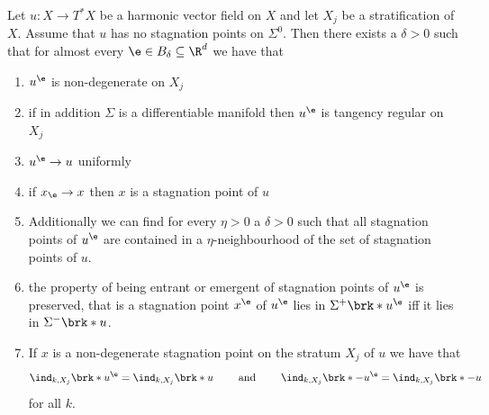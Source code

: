 \begin{corollary}\label{co:density_boundaryGeneric}
  Let $u\colon X\to T^*X$ be a harmonic vector field on $X$ and let $X_j$ be a stratification of $X$.
  Assume that $u$ has no stagnation points on $\Sigma^0$.
  Then there exists a $\delta>0$ such that for almost every $\e\in B_\delta\subseteq\R^d$ we have that
  \begin{enumerate}
    \item $u^\e$ is non-degenerate on $X_j$ \label{co:nonDegeneracy_density_nonDeg}
    \item if in addition $\Sigma$ is a differentiable manifold then $u^\e$ is tangency regular on $X_j$ \label{co:nonDegeneracy_density_tanReg}
    \item $u^\e\to u$ uniformly
    \item if $x_\e\to x$ then $x$ is a stagnation point of $u$
    \item Additionally we can find for every $\eta>0$ a $\delta>0$ such that all stagnation points of $u^\e$ are contained in a 
    $\eta$-neighbourhood of the set of stagnation points of $u$.
    \item the property of being entrant or emergent of stagnation points of $u^\e$ is preserved, that is 
      a stagnation point $x^\e$ of $u^\e$ lies in $\Sigma^+\brk*{u^\e}$ iff it lies in $\Sigma^-\brk*{u}$.
    \item If $x$ is a non-degenerate stagnation point on the stratum $X_j$ of $u$ we have that
     \begin{align*}
        \ind_{k,X_j}\brk*{u^\e}=\ind_{k,X_j}\brk*{u}\qquad\text{ and }\qquad\ind_{k,X_j}\brk*{-u^\e}=\ind_{k,X_j}\brk*{-u}
      \end{align*}
      for all $k$.
  \end{enumerate}
\end{corollary}
